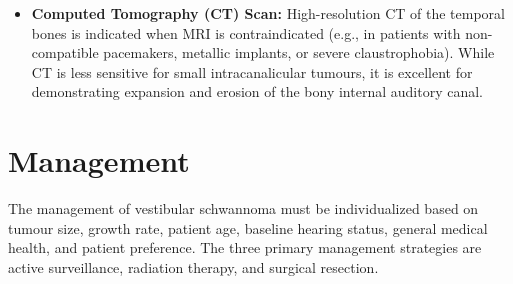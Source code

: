 \begin{itemize}
    \item \textbf{Computed Tomography (CT) Scan:} High-resolution CT of the temporal bones is indicated when MRI is contraindicated (e.g., in patients with non-compatible pacemakers, metallic implants, or severe claustrophobia). While CT is less sensitive for small intracanalicular tumours, it is excellent for demonstrating expansion and erosion of the bony internal auditory canal.
\end{itemize}

\section*{Management}
The management of vestibular schwannoma must be individualized based on tumour size, growth rate, patient age, baseline hearing status, general medical health, and patient preference. The three primary management strategies are active surveillance, radiation therapy, and surgical resection.
